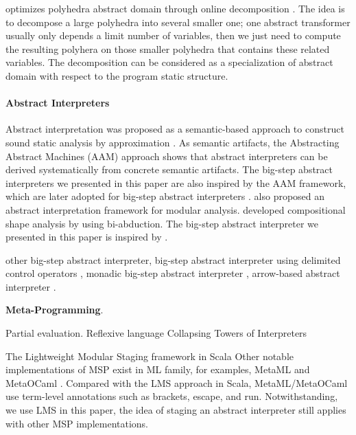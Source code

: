 \citeauthor{DBLP:conf/popl/SinghPV17} optimizes polyhedra abstract domain through online decomposition \cite{DBLP:conf/popl/SinghPV17, Singh:2017:PCD:3177123.3158143}.
The idea is to decompose a large polyhedra into several smaller one; one abstract transformer
usually only depends a limit number of variables, then we just need to compute the resulting polyhera
on those smaller polyhedra that contains these related variables.
The decomposition can be considered as a specialization of abstract domain with respect to the program
static structure.

\paragraph{Abstract Interpreters}
Abstract interpretation was proposed as a semantic-based approach to construct sound static analysis by approximation \cite{DBLP:conf/popl/CousotC77}.
As semantic artifacts, the Abstracting Abstract Machines (AAM) \cite{DBLP:journals/jfp/HornM12, DBLP:conf/icfp/HornM10}
approach shows that abstract interpreters can be derived systematically from concrete semantic artifacts.
The big-step abstract interpreters we presented in this paper are also inspired by the AAM framework,
which are later adopted for big-step abstract interpreters \cite{DBLP:journals/pacmpl/DaraisLNH17, Wei:2018:RAA:3243631.3236800}.
\citet{DBLP:conf/cc/CousotC02} also proposed an abstract interpretation framework for modular analysis.
\citet{DBLP:conf/popl/CalcagnoDOY09} developed compositional shape analysis by using bi-abduction.
The big-step abstract interpreter we presented in this paper is inspired by \cite{DBLP:journals/pacmpl/DaraisLNH17, Wei:2018:RAA:3243631.3236800}.

 other big-step abstract interpreter, 
big-step abstract interpreter using delimited control operators \cite{Wei:2018:RAA:3243631.3236800},
monadic big-step abstract interpreter \cite{DBLP:journals/pacmpl/DaraisLNH17},
arrow-based abstract interpreter \cite{Keidel:2018:CSP:3243631.3236767}.

\textbf{Meta-Programming}.

Partial evaluation. 
Reflexive language \cite{DBLP:conf/gpce/Asai14}
Collapsing Towers of Interpreters \cite{Amin:2017:CTI:3177123.3158140}

The Lightweight Modular Staging framework in Scala
Other notable implementations of MSP exist in ML family, for examples, MetaML \cite{DBLP:conf/pepm/TahaS97} 
and MetaOCaml \cite{DBLP:conf/gpce/CalcagnoTHL03, DBLP:conf/flops/Kiselyov14}.
Compared with the LMS approach in Scala, MetaML/MetaOCaml use term-level annotations such as brackets, 
escape, and run. Notwithstanding, we use LMS in this paper, the idea of staging an abstract interpreter
still applies with other MSP implementations.

